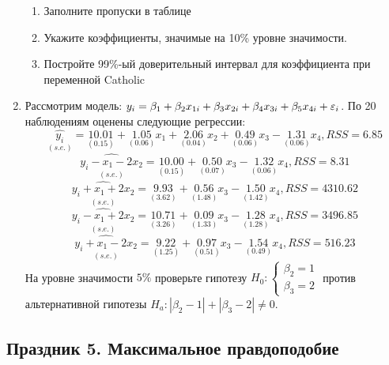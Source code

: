 \documentclass[12pt, a4paper]{article}
\begin{document}
\begin{enumerate}
\begin{enumerate}
\item Заполните пропуски в таблице
\item Укажите коэффициенты, значимые на 10\% уровне значимости.
\item Постройте 99\%-ый доверительный интервал для коэффициента при переменной Catholic
\end{enumerate}

\item Рассмотрим модель:
$y_i = \beta_1 + \beta_2 x_{1i} + \beta_3 x_{2i} + \beta_4 x_{3i} + \beta_5 x_{4i} + \varepsilon_i$.
По 20 наблюдениям оценены следующие регрессии:
\[
\underset{(s.e.)}{\hat{y_i}} = \underset{(0.15)}{10.01} + \underset{(0.06)}{1.05}x_1 + \underset{(0.04)}{2.06}x_2 + \underset{(0.06)}{0.49}x_3 - \underset{(0.06)}{1.31}x_4, RSS = 6.85
\]
\[
\underset{(s.e.)}{\widehat{y_i- x_1 - 2x_2}} = \underset{(0.15)}{10.00} + \underset{(0.07)}{0.50}x_3 - \underset{(0.06)}{1.32}x_4, RSS = 8.31
\]
\[
\underset{(s.e.)}{\widehat{y_i + x_1 + 2x_2}} = \underset{(3.62)}{9.93} + \underset{(1.48)}{0.56}x_3 - \underset{(1.42)}{1.50}x_4, RSS = 4310.62
\]
\[
\underset{(s.e.)}{\widehat{y_i - x_1 + 2x_2}} = \underset{(3.26)}{10.71} + \underset{(1.33)}{0.09}x_3 - \underset{(1.28)}{1.28}x_4, RSS = 3496.85
\]
\[
\underset{(s.e.)}{\widehat{y_i + x_1 - 2x_2}} = \underset{(1.25)}{9.22} + \underset{(0.51)}{0.97}x_3 - \underset{(0.49)}{1.54}x_4, RSS = 516.23
\]
На уровне значимости $5\%$ проверьте гипотезу $H_0: \begin{cases} \beta_2 = 1 \\ \beta_3 = 2 \end{cases}$ против альтернативной гипотезы $H_a: |\beta_2 - 1| + |\beta_3 - 2| \not= 0$.


\end{enumerate}



\subsection{Праздник 5. Максимальное правдоподобие}
\end{document}
